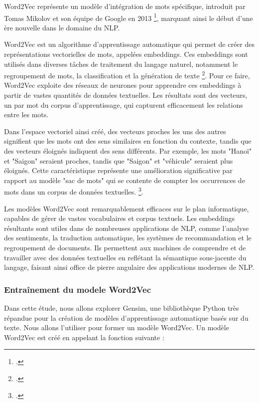 Word2Vec représente un modèle d'intégration de mots spécifique, introduit par Tomas Mikolov et son équipe de Google en 2013 \footcite{DBLP:journals/corr/MikolovSCCD13}, marquant ainsi le début d'une ère nouvelle dans le domaine du NLP.

Word2Vec est un algorithme d'apprentissage automatique qui permet de créer des représentations vectorielles de mots, appelées embeddings. Ces embeddings sont utilisés dans diverses tâches de traitement du langage naturel, notamment le regroupement de mots, la classification et la génération de texte \footcite{articleMikolovW2V}. Pour ce faire, Word2Vec exploite des réseaux de neurones pour apprendre ces embeddings à partir de vastes quantités de données textuelles. Les résultats sont des vecteurs, un par mot du corpus d'apprentissage, qui capturent efficacement les relations entre les mots.

Dans l'espace vectoriel ainsi créé, des vecteurs proches les uns des autres signifient que les mots ont des sens similaires en fonction du contexte, tandis que des vecteurs éloignés indiquent des sens différents. Par exemple, les mots "Hanoï" et "Saigon" seraient proches, tandis que "Saigon" et "véhicule" seraient plus éloignés. Cette caractéristique représente une amélioration significative par rapport au modèle "sac de mots" qui se contente de compter les occurrences de mots dans un corpus de données textuelles. \footcite{inproceedingsWord2vec}.

Les modèles Word2Vec sont remarquablement efficaces sur le plan informatique, capables de gérer de vastes vocabulaires et corpus textuels. Les embeddings résultants sont utiles dans de nombreuses applications de NLP, comme l'analyse des sentiments, la traduction automatique, les systèmes de recommandation et le regroupement de documents. Ils permettent aux machines de comprendre et de travailler avec des données textuelles en reflétant la sémantique sous-jacente du langage, faisant ainsi office de pierre angulaire des applications modernes de NLP.

\subsubsection{Entraînement du modele Word2Vec}
Dans cette étude, nous allons explorer Gensim, une bibliothèque Python très répandue pour la création de modèles d'apprentissage automatique basés sur du texte. Nous allons l'utiliser pour former un modèle Word2Vec. Un modèle Word2Vec est créé en appelant la fonction suivante :

